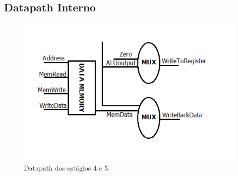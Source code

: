 \subsection{Datapath Interno}
	
	\begin{figure}[ht]
		\begin{center}
		\includegraphics{./datapath/Step4_e_Step5.png}
		\caption*{Datapath dos estágios 4 e 5.}
		\end{center}
	\end{figure}